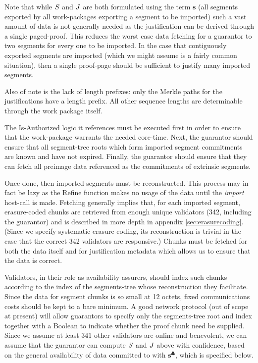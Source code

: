 Note that while $S$ and $J$ are both formulated using the term $\mathbf{s}$ (all segments exported by all work-packages exporting a segment to be imported) such a vast amount of data is not generally needed as the justification can be derived through a single paged-proof. This reduces the worst case data fetching for a guarantor to two segments for every one to be imported. In the case that contiguously exported segments are imported (which we might assume is a fairly common situation), then a single proof-page should be sufficient to justify many imported segments.

Also of note is the lack of length prefixes: only the Merkle paths for the justifications have a length prefix. All other sequence lengths are determinable through the work package itself.

The Is-Authorized logic it references must be executed first in order to ensure that the work-package warrants the needed core-time. Next, the guarantor should ensure that all segment-tree roots which form imported segment commitments are known and have not expired. Finally, the guarantor should ensure that they can fetch all preimage data referenced as the commitments of extrinsic segments.

Once done, then imported segments must be reconstructed. This process may in fact be lazy as the Refine function makes no usage of the data until the \emph{import} host-call is made. Fetching generally implies that, for each imported segment, erasure-coded chunks are retrieved from enough unique validators (342, including the guarantor) and is described in more depth in appendix \ref{sec:erasurecoding}. (Since we specify systematic erasure-coding, its reconstruction is trivial in the case that the correct 342 validators are responsive.) Chunks must be fetched for both the data itself and for justification metadata which allows us to ensure that the data is correct.

Validators, in their role as availability assurers, should index such chunks according to the index of the segments-tree whose reconstruction they facilitate. Since the data for segment chunks is so small at 12 octets, fixed communications costs should be kept to a bare minimum. A good network protocol (out of scope at present) will allow guarantors to specify only the segments-tree root and index together with a Boolean to indicate whether the proof chunk need be supplied. Since we assume at least 341 other validators are online and benevolent, we can assume that the guarantor can compute $S$ and $J$ above with confidence, based on the general availability of data committed to with $\mathbf{s}^\clubsuit$, which is specified below.

